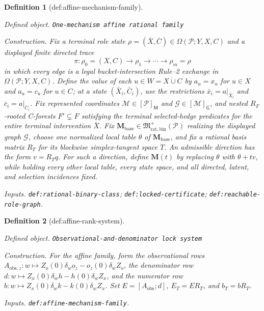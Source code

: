 \documentclass{article}
\newtheorem{definition}{Definition}
\begin{document}
\begin{definition}[def:affine-mechanism-family]\label{def:affine-mechanism-family}
\par\smallskip\noindent\emph{Defined object.} \texttt{One-\allowbreak{}mechanism affine rational family}
\par\smallskip\noindent\emph{Construction.} Fix a terminal role state \(\rho=(\bar X,\bar C)\in\Omega(\mathcal P;Y,X,C)\) and a displayed finite directed trace
\[
 \pi:\rho_0=(X,C)\longrightarrow\rho_1\longrightarrow\cdots\longrightarrow\rho_m=\rho
\]
in which every edge is a legal bucket-intersection Rule--2 exchange in \(\Omega(\mathcal P;Y,X,C)\).  Define the value of each \(u\in W=X\mathbin{\dot\cup}C\) by \(a_u=x_u\) for \(u\in X\) and \(a_u=c_u\) for \(u\in C\); at a state \((\bar X_i,\bar C_i)\), use the restrictions \(\bar x_i=a|_{\bar X_i}\) and \(\bar c_i=a|_{\bar C_i}\).  Fix represented coordinates \(\mathcal M\in[\mathcal P]_{\mathsf M}\) and \(\mathcal G\in[\mathcal M]_{\mathsf G}\), and nested \(R_F\)-rooted C-forests \(F'\subsetneq F\) satisfying the terminal selected-hedge predicates for the entire terminal intervention \(\bar X\).  Fix \(\mathbf M_{\mathrm{base}}\in\mathfrak M_{\mathrm{rat,bin}}^+(\mathcal P)\) realizing the displayed graph \(\mathcal G\), choose one normalized local table \(\theta\) of \(\mathbf M_{\mathrm{base}}\), and fix a rational basis matrix \(R_T\) for its blockwise simplex-tangent space \(T\).  An admissible direction has the form \(v=R_Tq\).  For such a direction, define \(\mathbf M(t)\) by replacing \(\theta\) with \(\theta+t v\), while holding every other local table, every state space, and all directed, latent, and selection incidences fixed.
\par\smallskip\noindent\emph{Inputs.} \texttt{def:\allowbreak{}rational-\allowbreak{}binary-\allowbreak{}class}; \texttt{def:\allowbreak{}locked-\allowbreak{}certificate}; \texttt{def:\allowbreak{}reachable-\allowbreak{}role-\allowbreak{}graph}.
\end{definition}

\begin{definition}[def:affine-rank-system]\label{def:affine-rank-system}
\par\smallskip\noindent\emph{Defined object.} \texttt{Observational-\allowbreak{}and-\allowbreak{}denominator lock system}
\par\smallskip\noindent\emph{Construction.} For the affine family, form the observational rows \(A_{\mathrm{obs},z}:w\mapsto Z_o(0)\delta_w o_z-o_z(0)\delta_w Z_o\), the denominator row \(d:w\mapsto Z_x(0)\delta_w h-h(0)\delta_w Z_x\), and the numerator row \(b:w\mapsto Z_x(0)\delta_w k-k(0)\delta_w Z_x\). Set \(E=[A_{\mathrm{obs}};d]\), \(E_T=ER_T\), and \(b_T=bR_T\).
\par\smallskip\noindent\emph{Inputs.} \texttt{def:\allowbreak{}affine-\allowbreak{}mechanism-\allowbreak{}family}.
\end{definition}
\end{document}
